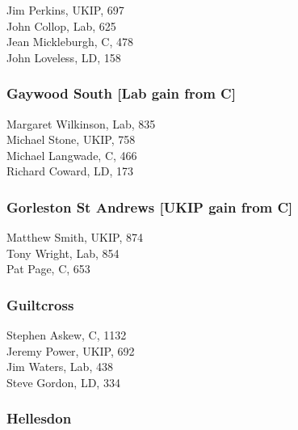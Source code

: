 \documentclass[a4paper,openany,10pt]{book}
\begin{document}
Jim Perkins, UKIP, 697\\
John Collop, Lab, 625\\
Jean Mickleburgh, C, 478\\
John Loveless, LD, 158\\


\subsubsection*{Gaywood South \hspace*{\fill}\nolinebreak[1]%
\enspace\hspace*{\fill}
[Lab gain from C]}



Margaret Wilkinson, Lab, 835\\
Michael Stone, UKIP, 758\\
Michael Langwade, C, 466\\
Richard Coward, LD, 173\\


\subsubsection*{Gorleston St Andrews \hspace*{\fill}\nolinebreak[1]%
\enspace\hspace*{\fill}
[UKIP gain from C]}



Matthew Smith, UKIP, 874\\
Tony Wright, Lab, 854\\
Pat Page, C, 653\\


\subsubsection*{Guiltcross}



Stephen Askew, C, 1132\\
Jeremy Power, UKIP, 692\\
Jim Waters, Lab, 438\\
Steve Gordon, LD, 334\\


\subsubsection*{Hellesdon}
\end{document}
